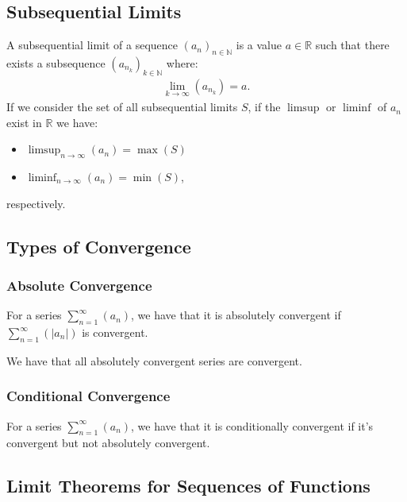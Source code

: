 \documentclass[a4paper, 12pt, twoside]{article}
\begin{document}
\subsection{Subsequential Limits}

A subsequential limit of a sequence $(a_n)_{n \in \mathbb{N}}$ is a value
$a \in \mathbb{R}$ such that there exists a subsequence
$(a_{n_k})_{k\in\mathbb{N}}$ where:
\begin{align*}
      \lim_{k\to\infty}(a_{n_k}) = a.
\end{align*}
If we consider the set of all subsequential limits $S$, if the $\limsup$ or
$\liminf$ of $a_n$ exist in $\mathbb{R}$ we have:

\begin{itemize}
      \item $\limsup_{n\to\infty}(a_n) = \max(S)$
      \item $\liminf_{n\to\infty}(a_n) = \min(S)$,
\end{itemize}

respectively.

\subsection{Types of Convergence}

\subsubsection{Absolute Convergence}

For a series $\sum_{n = 1}^\infty(a_n)$, we have that it is absolutely
convergent if $\sum_{n = 1}^\infty(|a_n|)$ is convergent.

\vspace{\baselineskip}

We have that all absolutely convergent series are convergent.

\subsubsection{Conditional Convergence}

For a series $\sum_{n = 1}^\infty(a_n)$, we have that it is conditionally
convergent if it's convergent but not absolutely convergent.

\subsection{Limit Theorems for Sequences of Functions}
\end{document}
